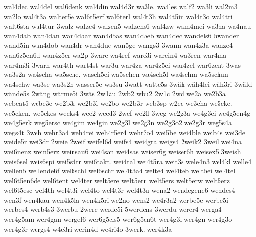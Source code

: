 {    wal4dec
    wal4del
    wal6denk
    wal4din
    wal4d3r
    wa3le.
    wa4les
    walf2
    wa3li
    wal2m3
    wa2lo
    wal4t3a
    walter5e
    wal6t5erf
    wal6terl
    wal4t3h
    wal4t5in
    wal4t3o
    wal4tri
    walt6sta
    wal4tur
    3walz
    walze4
    walzen5
    walzens6
    wal4zw
    wam4mei
    wa3na
    wa4nau
    wan4dab
    wan4dan
    wan4d5ar
    wan4d5as
    wan4d5eb
    wan4dec
    wandels6
    5wander
    wand5in
    wan4dob
    wan4dr
    wan4due
    wan5ge
    wangs3
    3wann
    wan4z3a
    wanze4
    wan6z5en6d
    wan4z5er
    wa2p
    3ware
    wa4ref
    ware3i
    warein4
    wa3ren
    war4ma
    war4m3i
    3warn
    war4th
    wart4st
    war3u
    war4za
    war4z5ei
    war4zel
    war6zent
    3was
    wa3s2a
    wa4scha
    wa5sche.
    wasch5ei
    wa5schen
    wa4sch5l
    wa4schm
    wa5schun
    wa4schw
    wa3se
    wa3s2h
    wasser5e
    wa3su
    3watt
    watte5s
    3wäh
    wäh4lei
    wäh3ri
    3wäld
    wände5s
    2wäng
    wärme5i
    3wäs
    2w1äu
    2wb2
    wbu2
    2w1c
    2wd
    we2a
    we2b3a
    webeat5
    webe3e
    we2b3i
    we2b3l
    we2bo
    we2b3r
    web3sp
    w2ec
    we3cha
    we5cke.
    we5cken.
    we5ckes
    wecks4
    wee2
    weed3
    2wef
    we2fl
    3weg
    we2g3a
    we4g3ei
    we4g5en4g
    we4g5erk
    weg5ersc
    we4gim
    we4gin
    we2g3l
    we2g3n
    we2g3o2
    we2g3r
    weg5s4a
    wegs4t
    3weh
    wehr3a4
    weh4rei
    weh4r5er4
    wehr3o4
    wei5be
    wei4ble
    weib4s
    wei3de
    weide5r
    wei3dr
    2weie
    2weif
    weifel6d
    weifs4
    wei4gra
    weigs4
    2weik2
    3weil
    wei4na
    wei6nenz
    wein5erz
    weinsau6
    wei4san
    wei4sas
    weiser6g
    weiser6h
    weisex5
    3weish
    weis6sel
    weis6spi
    wei5s4tr
    wei6takt.
    wei4tal
    wei4t5ra
    weit3s
    wele4n3
    wel4kl
    welle4
    wellen5
    wellende6f
    wel6schl
    wel6schr
    wel4t3a4
    welte4
    wel4teb
    welt5ei
    wel4tel
    wel6t5en6de
    wel6tent
    wel4ter
    welt5ere
    welt5ern
    welt5ers
    welt5erw
    welt5erz
    wel6t5esc
    wel4th
    wel4t3i
    wel4to
    wel4t3r
    wel4t3u
    wena2
    wendegene6
    wendes4
    wen3f
    wen4kau
    wen4k5la
    wen4k5ri
    we2no
    wens2
    we4r3a2
    werbe5e
    werbe5i
    werbes4
    werb4s3
    3werbu
    2werc
    werde5i
    5werdens
    3werdu
    werer4
    werga4
    wer4g5am
    wer4gan
    wergel6
    wer6g5els5
    wer6g5en6t
    wer4g3l
    wer4gn
    wer4g3o
    wer4g3r
    wergs4
    w4e3ri
    werin4d
    we4ri4o
    3werk.
    wer4k3a
}
